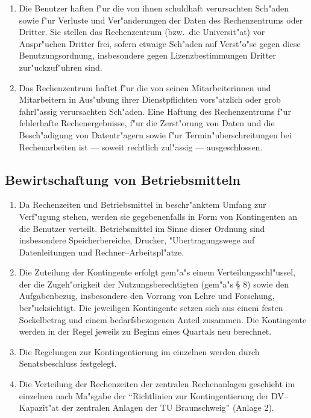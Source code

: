 \begin{enumerate}
  \item Die Benutzer haften f"ur die von ihnen schuldhaft verursachten
    Sch"aden sowie f"ur Verluste und Ver"anderungen der Daten
    des Rechenzentrums oder Dritter. Sie stellen das Rechenzentrum (bzw.\ 
    die Universit"at) vor Anspr"uchen Dritter frei, sofern etwaige
    Sch"aden auf Verst"o"se gegen diese Benutzungsordnung,
    insbesondere gegen Lizenzbestimmungen Dritter zur"uckzuf"uhren
    sind.

  \item Das Rechenzentrum haftet f"ur die von seinen Mitarbeiterinnen und
    Mitarbeitern in Aus"ubung ihrer Dienstpflichten vors"atzlich
    oder grob fahrl"assig verursachten Sch"aden. Eine Haftung des
    Rechenzentrums f"ur fehlerhafte Rechenergebnisse, f"ur die
    Zerst"orung von Daten und die Besch"adigung von Datentr"agern
    sowie f"ur Termin"uberschreitungen bei Rechenarbeiten ist ---
    soweit rechtlich zul"assig --- ausgeschlossen.
\end{enumerate}

\subsection{Bewirtschaftung von Betriebsmitteln}


\begin{enumerate}
  \item Da Rechenzeiten und Betriebsmittel in beschr"anktem Umfang zur
    Verf"ugung stehen, werden sie gegebenenfalls in Form von
    Kontingenten an die Benutzer verteilt. Betriebsmittel im Sinne dieser
    Ordnung sind insbesondere Speicherbereiche, Drucker, "Ubertragungswege
    auf Datenleitungen und Rechner--Arbeitspl"atze.

  \item Die Zuteilung der Kontingente erfolgt gem"a"s einem
    Verteilungsschl"ussel, der die Zugeh"origkeit der
    Nutzungsberechtigten (gem"a"s \S{} 8) sowie den Aufgabenbezug,
    insbesondere den Vorrang von Lehre und Forschung, ber"ucksichtigt.
    Die jeweiligen Kontingente setzen sich aus einem festen Sockelbetrag
    und einem bedarfsbezogenen Anteil zusammen. Die Kontingente werden in
    der Regel jeweils zu Beginn eines Quartals neu berechnet.

  \item Die Regelungen zur Kontingentierung im einzelnen werden durch
    Senatsbeschluss festgelegt.

  \item Die Verteilung der Rechenzeiten der zentralen Rechenanlagen geschieht
    im einzelnen nach Ma"sgabe der "`Richtlinien zur Kontingentierung der
    DV--Kapazit"at der zentralen Anlagen der TU Braunschweig"' (Anlage 2).
\end{enumerate}


